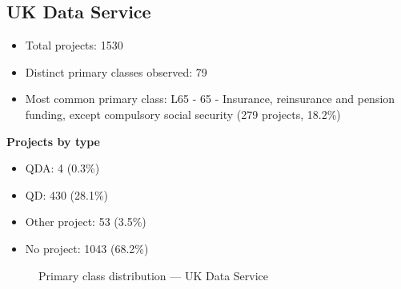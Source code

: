 \subsection{UK Data Service}

\begin{itemize}
    \item Total projects: 1530
    \item Distinct primary classes observed: 79
    \item Most common primary class: L65 - 65 - Insurance, reinsurance and pension funding, except compulsory social security (279 projects, 18.2\%)
\end{itemize}
\textbf{Projects by type}
\begin{itemize}
    \item QDA: 4 (0.3\%)
    \item QD: 430 (28.1\%)
    \item Other project: 53 (3.5\%)
    \item No project: 1043 (68.2\%)
\end{itemize}

\begin{figure}[H]
    \centering
    
    \caption{Primary class distribution --- UK Data Service}
\end{figure}

